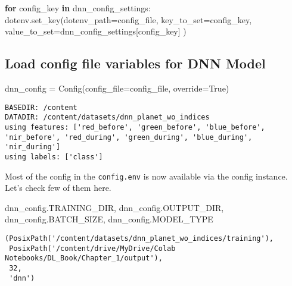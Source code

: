 \documentclass[
  letterpaper,
  DIV=11,
  numbers=noendperiod]{scrreprt}
\newenvironment{Shaded}{\begin{snugshade}}{\end{snugshade}}
\newcommand{\ControlFlowTok}[1]{\textcolor[rgb]{0.00,0.23,0.31}{\textbf{#1}}}
\newcommand{\KeywordTok}[1]{\textcolor[rgb]{0.00,0.23,0.31}{\textbf{#1}}}
\newcommand{\NormalTok}[1]{\textcolor[rgb]{0.00,0.23,0.31}{#1}}
\newcommand{\OperatorTok}[1]{\textcolor[rgb]{0.37,0.37,0.37}{#1}}
\newcommand{\VariableTok}[1]{\textcolor[rgb]{0.07,0.07,0.07}{#1}}
\begin{document}
\begin{Shaded}
\begin{Highlighting}[]
\ControlFlowTok{for}\NormalTok{ config\_key }\KeywordTok{in}\NormalTok{ dnn\_config\_settings:}
\NormalTok{    dotenv.set\_key(dotenv\_path}\OperatorTok{=}\NormalTok{config\_file,}
\NormalTok{                   key\_to\_set}\OperatorTok{=}\NormalTok{config\_key,}
\NormalTok{                   value\_to\_set}\OperatorTok{=}\NormalTok{dnn\_config\_settings[config\_key]}
\NormalTok{                   )}
\end{Highlighting}
\end{Shaded}

\subsection{Load config file variables for DNN
Model}\label{load-config-file-variables-for-dnn-model}

\begin{Shaded}
\begin{Highlighting}[]
\NormalTok{dnn\_config }\OperatorTok{=}\NormalTok{ Config(config\_file}\OperatorTok{=}\NormalTok{config\_file, override}\OperatorTok{=}\VariableTok{True}\NormalTok{)}
\end{Highlighting}
\end{Shaded}

\begin{verbatim}
BASEDIR: /content
DATADIR: /content/datasets/dnn_planet_wo_indices
using features: ['red_before', 'green_before', 'blue_before', 'nir_before', 'red_during', 'green_during', 'blue_during', 'nir_during']
using labels: ['class']
\end{verbatim}

Most of the config in the \texttt{config.env} is now available via the
config instance. Let's check few of them here.

\begin{Shaded}
\begin{Highlighting}[]
\NormalTok{dnn\_config.TRAINING\_DIR, dnn\_config.OUTPUT\_DIR, dnn\_config.BATCH\_SIZE, dnn\_config.MODEL\_TYPE}
\end{Highlighting}
\end{Shaded}

\begin{verbatim}
(PosixPath('/content/datasets/dnn_planet_wo_indices/training'),
 PosixPath('/content/drive/MyDrive/Colab Notebooks/DL_Book/Chapter_1/output'),
 32,
 'dnn')
\end{verbatim}
\end{document}
